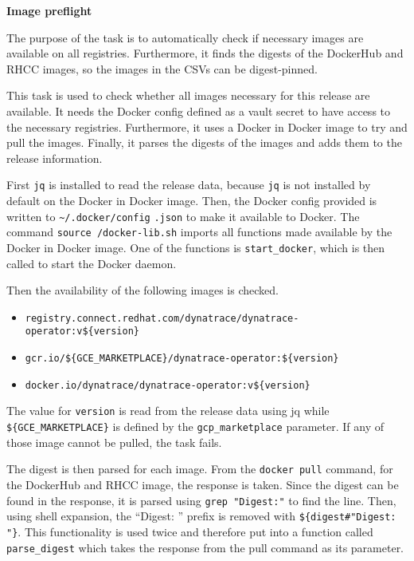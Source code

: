 \textbf{Image preflight}

The purpose of the task is to automatically check if necessary images are available on all registries.
Furthermore, it finds the digests of the DockerHub and RHCC images, so the images in the CSVs can be digest-pinned.

This task is used to check whether all images necessary for this release are available.
It needs the Docker config defined as a vault secret to have access to the necessary registries.
Furthermore, it uses a Docker in Docker image to try and pull the images.
Finally, it parses the digests of the images and adds them to the release information.

First \verb|jq| is installed to read the release data, because \verb|jq| is not installed by default on the Docker in Docker image.
Then, the Docker config provided is written to \verb|~/.docker/config| \verb|.json| to make it available to Docker.
The command \verb|source /docker-lib.sh| imports all functions made available by the Docker in Docker image.
One of the functions is \verb|start_docker|, which is then called to start the Docker daemon.

Then the availability of the following images is checked.
\begin{itemize}
    \item \verb|registry.connect.redhat.com/dynatrace/dynatrace-operator:v${version}|
    \item \verb|gcr.io/${GCE_MARKETPLACE}/dynatrace-operator:${version}|
    \item \verb|docker.io/dynatrace/dynatrace-operator:v${version}|
\end{itemize}

The value for \verb|version| is read from the release data using jq while \verb|${GCE_MARKETPLACE}| is defined by the \verb|gcp_marketplace| parameter.
If any of those image cannot be pulled, the task fails.

The digest is then parsed for each image.
From the \verb|docker pull| command, for the DockerHub and RHCC image, the response is taken.
Since the digest can be found in the response, it is parsed using \verb|grep "Digest:"| to find the line.
Then, using shell expansion, the ``Digest: '' prefix is removed with \verb|${digest#"Digest: "}|.
This functionality is used twice and therefore put into a function called \verb|parse_digest| which takes the response from the pull command as its parameter.
